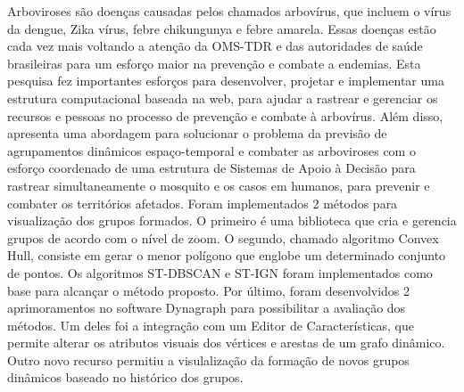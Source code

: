 Arboviroses são doenças causadas pelos chamados arbovírus, que incluem o vírus da dengue, Zika vírus, febre chikungunya e febre amarela. Essas doenças estão cada vez mais voltando a atenção da OMS-TDR e das autoridades de saúde brasileiras para um esforço maior na prevenção e combate a endemias. Esta pesquisa fez importantes esforços para desenvolver, projetar e implementar uma estrutura computacional baseada na web, para ajudar a rastrear e gerenciar os recursos e pessoas no processo de prevenção e combate à arbovírus. Além disso, apresenta uma abordagem para solucionar o problema da previsão de agrupamentos dinâmicos espaço-temporal e combater as arboviroses com o esforço coordenado de uma estrutura de Sistemas de Apoio à Decisão para rastrear simultaneamente o mosquito e os casos em humanos, para prevenir e combater os territórios afetados.
 Foram implementados 2 métodos para visualização dos grupos formados.
O primeiro é uma biblioteca que cria e gerencia grupos de acordo com o nível de zoom.
O segundo, chamado algoritmo Convex Hull, consiste em gerar o menor polígono que englobe um determinado
conjunto de pontos. Os algoritmos ST-DBSCAN e ST-IGN foram implementados como base para alcançar o método proposto.
Por último, foram desenvolvidos 2 aprimoramentos no software Dynagraph para
possibilitar a avaliação dos métodos. Um deles foi a integração com um Editor de
Características, que permite alterar os atributos visuais dos vértices e arestas de um
grafo dinâmico. Outro novo recurso permitiu a visulalização da formação de novos grupos dinâmicos baseado no histórico dos grupos.


